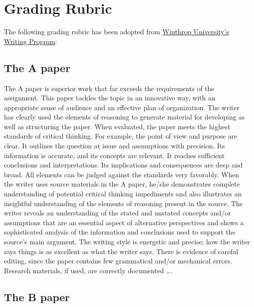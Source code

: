 
\chapter{Grading Rubric}


The following grading rubric has been adopted from 
\href{http://www2.winthrop.edu/english/WritingProgram/rubric.htm}{Winthrop University's Writing Program}:

\section{The A paper}
The A paper is superior work that far exceeds the requirements of the assignment. This 
paper tackles the topic in an innovative way, with an appropriate sense of audience 
and an effective plan of organization. The writer has clearly used the elements of 
reasoning to generate material for developing as well as structuring the paper. When 
evaluated, the paper meets the highest standards of critical thinking. For example, the 
point of view and purpose are clear. It outlines the question at issue and assumptions 
with precision. Its information is accurate, and its concepts are relevant. It reaches 
sufficient conclusions and interpretations. Its implications and consequences are deep 
and broad. All elements can be judged against the standards very favorably. When the 
writer uses source materials in the A paper, he/she demonstrates complete 
understanding of potential critical thinking impediments and also illustrates an insightful 
understanding of the elements of reasoning present in the source. The writer reveals 
an understanding of the stated and unstated concepts and/or assumptions that are an 
essential aspect of alternative perspectives and shows a sophisticated analysis of the 
information and conclusions used to support the source’s main argument. The writing 
style is energetic and precise; how the writer says things is as excellent as what the 
writer says. There is evidence of careful editing, since the paper contains few 
grammatical and/or mechanical errors. Research materials, if used, are correctly 
documented \dots.

\section{The B paper}

